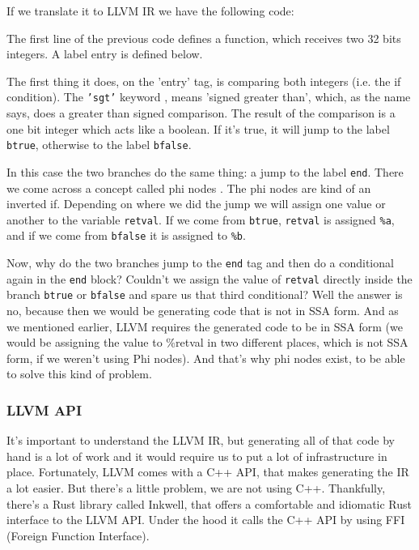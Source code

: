 ﻿\documentclass[10pt,a4paper,twocolumn,twoside]{article}
\begin{document}
If we translate it to LLVM IR we have the following code:


The first line of the previous code defines a function, which receives two
32 bits integers. A label entry is defined below.

The first thing it does, on the 'entry' tag, is comparing both integers (i.e.
the if condition). The \texttt{'sgt'} keyword \cite{sgt}, means 'signed greater
than', which, as the name says, does a greater than signed comparison. The
result of the comparison is a one bit integer which acts like a boolean. If it's
true, it will jump to the label \texttt{btrue}, otherwise to the label
\texttt{bfalse}.

In this case the two branches do the same thing: a jump to the label
\texttt{end}. There we come across a concept called phi nodes \cite{phitutorial}.
The phi nodes are kind of an inverted if. Depending on where we did the jump we
will assign one value or another to the variable \texttt{retval}. If we come
from \texttt{btrue}, \texttt{retval} is assigned \texttt{\%a}, and if we come
from \texttt{bfalse} it is assigned to \texttt{\%b}.

Now, why do the two branches jump to the \texttt{end} tag and then do a
conditional again in the \texttt{end} block? Couldn't we assign the value of
\texttt{retval} directly inside the branch \texttt{btrue} or \texttt{bfalse} and
spare us that third conditional? Well the answer is no, because then we would be
generating code that is not in SSA form. And as we mentioned earlier, LLVM
requires the generated code to be in SSA form (we would be assigning the value
to \%retval in two different places, which is not SSA form, if we weren't using
Phi nodes). And that's why phi nodes exist, to be able to solve this kind of
problem.

\subsubsection{LLVM API}

It's important to understand the LLVM IR, but generating all of that code by
hand is a lot of work and it would require us to put a lot of infrastructure in
place. Fortunately, LLVM comes with a C++ API, that makes generating the IR a
lot easier. But there's a little problem, we are not using C++. Thankfully,
there's a Rust library called Inkwell\cite{inkwell}, that offers a comfortable
and idiomatic Rust interface to the LLVM API. Under the hood it calls the C++
API by using FFI (Foreign Function Interface).
\end{document}
